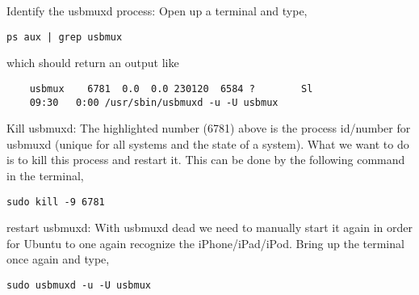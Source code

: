 \documentclass{article}
\begin{document}
\begin{itemize}
Identify the usbmuxd process: Open up a terminal and type,
\begin{lstlisting}
ps aux | grep usbmux
\end{lstlisting}
which should return an output like
\begin{lstlisting}
    usbmux    6781  0.0  0.0 230120  6584 ?        Sl
    09:30   0:00 /usr/sbin/usbmuxd -u -U usbmux
\end{lstlisting}
Kill usbmuxd: The highlighted number (6781) above is the process id/number for
usbmuxd (unique for all systems and the state of a system). What we want to do
is to kill this process and restart it. This can be done by the following
command in the terminal,
\begin{lstlisting}
sudo kill -9 6781
\end{lstlisting}
restart usbmuxd: With usbmuxd dead we need to manually start it again in
order for Ubuntu to one again recognize the iPhone/iPad/iPod. Bring up the
terminal once again and type,
\begin{lstlisting}
sudo usbmuxd -u -U usbmux
\end{lstlisting}
\end{itemize}
\end{document}

